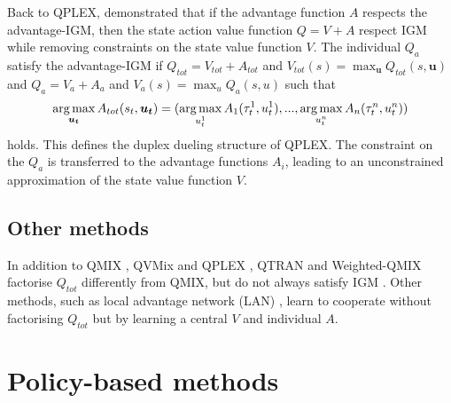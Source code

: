 Back to QPLEX, \citet{wang2021qplex} demonstrated that if the advantage function $A$ respects the advantage-IGM, then the state action value function $Q = V + A$ respect IGM while removing constraints on the state value function $V$.
The individual $Q_a$ satisfy the advantage-IGM if $Q_{tot}=V_{tot}+A_{tot}$ and $V_{tot}(s)=\max_{\mathbf{u}} Q_{tot}(s, \mathbf{u})$ and $Q_a=V_a+A_a$ and $V_a(s)=\max_{u} Q_a(s, u)$ such that 
\begin{equation}
    \argmax_{\mathbf{u_t}} A_{tot}(s_t, \mathbf{u_t}) =(\argmax_{u_t^{1}} A_{1}(\tau_t^{1}, u_t^{1}),...,\argmax_{u_t^{n}} A_{n}(\tau_t^{n}, u_t^{n}))    
\label{eq:ch3_adv_igm}
\end{equation}
holds.
This defines the duplex dueling structure of QPLEX.
The constraint on the $Q_a$ is transferred to the advantage functions $A_i$, leading to an unconstrained approximation of the state value function $V$.

\subsection{Other methods}
In addition to QMIX \citep{Rashid2018}, QVMix \citep{leroy2020qvmix} and QPLEX \citep{wang2021qplex}, QTRAN \citep{Son2019QTRAN:Learning} and Weighted-QMIX \citep{rashid2020weighted} factorise $Q_{tot}$ differently from QMIX, but do not always satisfy IGM \citep{Son2019QTRAN:Learning}.
Other methods, such as local advantage network (LAN) \citep{avalos2023local}, learn to cooperate without factorising $Q_{tot}$ but by learning a central $V$ and individual $A$.

\section{Policy-based methods}
\label{sec:ch3_policy}

